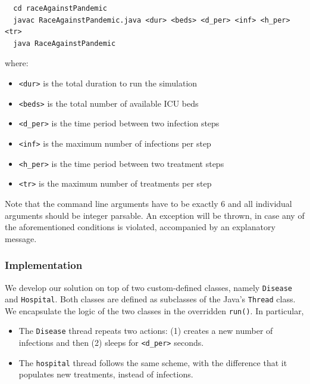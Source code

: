 \documentclass[acmlarge]{acmart}
\begin{document}
\begin{verbatim}
  cd raceAgainstPandemic
  javac RaceAgainstPandemic.java <dur> <beds> <d_per> <inf> <h_per> <tr>
  java RaceAgainstPandemic
\end{verbatim}
where:
\begin{itemize}
  \item \texttt{<dur>} is the total duration to run the simulation
  \item \texttt{<beds>} is the total number of available ICU beds
  \item \texttt{<d\_per>} is the time period between two infection steps
  \item \texttt{<inf>} is the maximum number of infections per step
  \item \texttt{<h\_per>} is the time period between two treatment steps
  \item \texttt{<tr>} is the maximum number of treatments per step
\end{itemize}
Note that the command line arguments have to be exactly 6 and all individual arguments should be integer parsable. An exception will be thrown, in case any of the aforementioned conditions is violated, accompanied by an explanatory message.

\subsubsection{Implementation}
We develop our solution on top of two custom-defined classes, namely \texttt{Disease} and \texttt{Hospital}. Both classes are defined as subclasses of the Java's \texttt{Thread} class. We encapsulate the logic of the two classes in the overridden \texttt{run()}. In particular,
\begin{itemize}
  \item The \texttt{Disease} thread repeats two actions: (1) creates a new number of infections and then (2) sleeps for \texttt{<d\_per>} seconds.
  \item The \texttt{hospital} thread follows the same scheme, with the difference that it populates new treatments, instead of infections.
\end{itemize}
\end{document}
